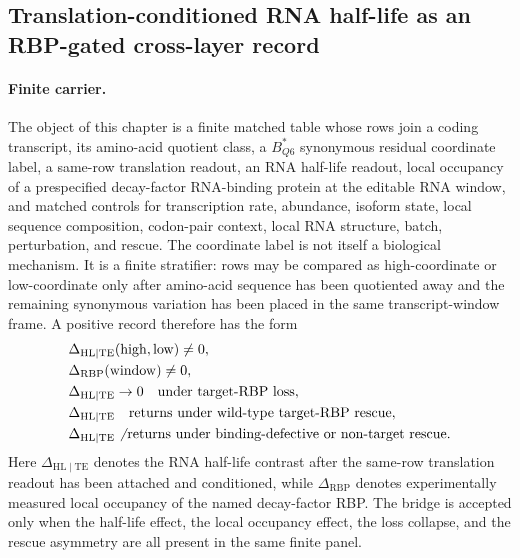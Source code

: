 \subsection{Translation-conditioned RNA half-life as an RBP-gated cross-layer record}
\label{sec:q6-translation-conditioned-rna-half-life-rbp-bridge-cross-layer}

\paragraph{Finite carrier.}
The object of this chapter is a finite matched table whose rows join a coding transcript, its amino-acid quotient class, a $B^{*}_{Q6}$ synonymous residual coordinate label, a same-row translation readout, an RNA half-life readout, local occupancy of a prespecified decay-factor RNA-binding protein at the editable RNA window, and matched controls for transcription rate, abundance, isoform state, local sequence composition, codon-pair context, local RNA structure, batch, perturbation, and rescue.  The coordinate label is not itself a biological mechanism.  It is a finite stratifier: rows may be compared as high-coordinate or low-coordinate only after amino-acid sequence has been quotiented away and the remaining synonymous variation has been placed in the same transcript-window frame.  A positive record therefore has the form
$$
\begin{aligned}
&\Delta_{\mathrm{HL}\mid \mathrm{TE}}(\mathrm{high},\mathrm{low}) \neq 0,\\
&\Delta_{\mathrm{RBP}}(\mathrm{window}) \neq 0,\\
&\Delta_{\mathrm{HL}\mid \mathrm{TE}} \to 0 \quad \text{under target-RBP loss},\\
&\Delta_{\mathrm{HL}\mid \mathrm{TE}} \quad \text{returns under wild-type target-RBP rescue},\\
&\Delta_{\mathrm{HL}\mid \mathrm{TE}} \not\text{ returns under binding-defective or non-target rescue}.
\end{aligned}
$$
Here $\Delta_{\mathrm{HL}\mid \mathrm{TE}}$ denotes the RNA half-life contrast after the same-row translation readout has been attached and conditioned, while $\Delta_{\mathrm{RBP}}$ denotes experimentally measured local occupancy of the named decay-factor RBP.  The bridge is accepted only when the half-life effect, the local occupancy effect, the loss collapse, and the rescue asymmetry are all present in the same finite panel.

